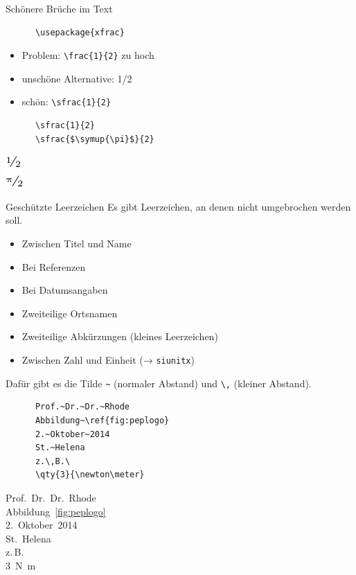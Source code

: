 \begin{frame}[fragile]{Schönere Brüche im Text}
  \begin{Packages}
    \begin{lstlisting}
      \usepackage{xfrac}
    \end{lstlisting}
  \end{Packages}
  \begin{itemize}
    \item Problem: \lstinline+\frac{1}{2}+ zu hoch
    \item unschöne Alternative: 1/2
    \item schön: \lstinline+\sfrac{1}{2}+
  \end{itemize}
  \begin{CodeExample}{0.5}
    \begin{lstlisting}
      \sfrac{1}{2}
      \sfrac{$\symup{\pi}$}{2}
    \end{lstlisting}
  \CodeResult
    \includegraphics[scale=0.8]{figures/xfrac.pdf}
  \end{CodeExample}
\end{frame}

\begin{frame}[fragile]{Geschützte Leerzeichen}
  Es gibt Leerzeichen, an denen nicht umgebrochen werden soll. \\
  \begin{itemize}
    \item Zwischen Titel und Name
    \item Bei Referenzen
    \item Bei Datumsangaben
    \item Zweiteilige Ortsnamen
    \item Zweiteilige Abkürzungen (kleines Leerzeichen)
    \item Zwischen Zahl und Einheit (→ \texttt{siunitx})
  \end{itemize}
  Dafür gibt es die Tilde \lstinline+~+ (normaler Abstand) und \lstinline+\,+ (kleiner Abstand).
  \begin{CodeExample}{0.5}
    \begin{lstlisting}
      Prof.~Dr.~Dr.~Rhode
      Abbildung~\ref{fig:peplogo}
      2.~Oktober~2014
      St.~Helena
      z.\,B.\
      \qty{3}{\newton\meter}
    \end{lstlisting}
    \CodeResult
      \strut
      Prof.~Dr.~Dr.~Rhode \\
      Abbildung~\ref{fig:peplogo} \\
      2.~Oktober~2014 \\
      St.~Helena \\
      z.\,B.\ \\
      \qty{3}{\newton\meter}
  \end{CodeExample}
\end{frame}

